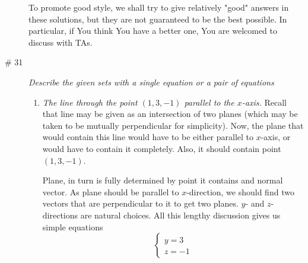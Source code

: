 \documentclass[8pt]{article} %
\begin{document}
\begin{description}
{To promote good style, we shall try to give relatively "good" answers in these solutions, but they are not guaranteed to be the best possible.
In particular, if You think You have a better one, You are welcomed to discuss with TAs.
}
\item[\# 31]{
{\it Describe the given sets with a single equation or a pair of equations}
\begin{enumerate}[label=\bfseries\alph*.]
\item{{\it The line through the point $(1,3,-1)$ parallel to the $x$-axis.} Recall that line may be given as an intersection of two planes (which
may be taken to be mutually perpendicular for simplicity). Now, the plane that would contain this line would have to be either
parallel to $x$-axis, or would have to contain it completely. Also, it should contain point $(1,3,-1)$.

Plane, in turn is fully determined by point it contains and normal vector. As plane should be parallel to $x$-direction, we should find two vectors
that are perpendicular to it to get two planes. $y$- and $z$-directions are natural choices. All this lengthy discussion gives us simple equations
\[\begin{cases}y=3\\z=-1\end{cases}\]

}
\end{enumerate}}
\end{description}
\end{document}
